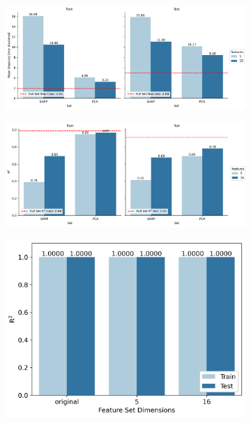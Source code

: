 \documentclass[journal=jacsat,manuscript=article]{achemso}
\begin{document}
 \begin{figure}[H]
	\centering
	\begin{subfigure}[b]{0.49\textwidth}
		\centering
		\includegraphics[width=\textwidth]{../images/BSE/classical_features_MAE.png}
		\caption{}
		\label{fig:BSE_bse_classical_features_MAE}
	\end{subfigure}
	\hfill		
	\begin{subfigure}[b]{0.49\textwidth}
		\centering
		\includegraphics[width=\textwidth]{../images/BSE/classical_features_R2.png}
		\caption{}
		\label{fig:BSE_classical_features_R2}
	\end{subfigure}
	\hfill		
	\begin{subfigure}[b]{0.49\textwidth}
		\centering
		\includegraphics[width=\textwidth]{../images/DDCC/DDCC_feature_set.png}
		\caption{}
		\label{fig:DDCC_feature_set}
	\end{subfigure}
	\hfill	
	\caption{}
	\label{fig:chemical_classical_features}
\end{figure}
\end{document}
